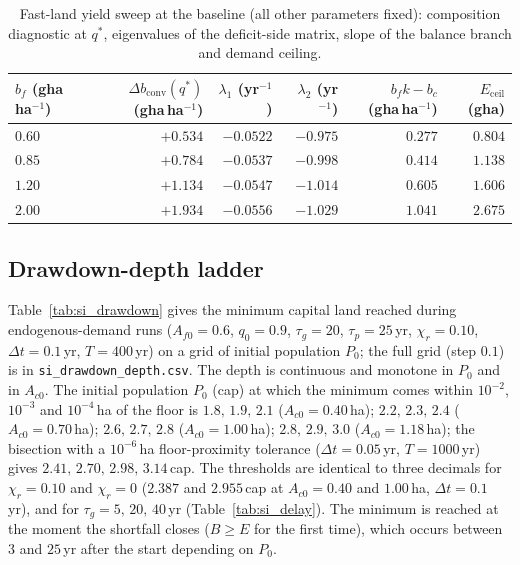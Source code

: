 \documentclass[11pt,a4paper]{article}
\newcommand{\dconv}{\Delta b_{\mathrm{conv}}}
\newcommand{\Eceil}{E_{\mathrm{ceil}}}
\begin{document}
\begin{table}[htbp]
\centering\small
\caption{Fast-land yield sweep at the baseline (all other parameters fixed): composition diagnostic at $q^*$, eigenvalues of the deficit-side matrix, slope of the balance branch and demand ceiling.}
\label{tab:si_sweep}
\begin{tabular}{l r r r r r}
\toprule
$b_f$ (gha\,ha$^{-1}$) & $\dconv(q^*)$ (gha\,ha$^{-1}$) & $\lambda_1$ (yr$^{-1}$) & $\lambda_2$ (yr$^{-1}$) & $b_fk-b_c$ (gha\,ha$^{-1}$) & $\Eceil$ (gha) \\
\midrule
$0.60$ & $+0.534$ & $-0.0522$ & $-0.975$ & $0.277$ & $0.804$ \\
$0.85$ & $+0.784$ & $-0.0537$ & $-0.998$ & $0.414$ & $1.138$ \\
$1.20$ & $+1.134$ & $-0.0547$ & $-1.014$ & $0.605$ & $1.606$ \\
$2.00$ & $+1.934$ & $-0.0556$ & $-1.029$ & $1.041$ & $2.675$ \\
\bottomrule
\end{tabular}
\end{table}

\subsection{Drawdown-depth ladder}\label{si:ladder}

Table~\ref{tab:si_drawdown} gives the minimum capital land reached during endogenous-demand runs ($A_{f0}=0.6$, $q_0=0.9$, $\tau_g=20$, $\tau_p=25$\,yr, $\chi_r=0.10$, $\Delta t=0.1$\,yr, $T=400$\,yr) on a grid of initial population $P_0$; the full grid (step $0.1$) is in \texttt{si\_drawdown\_depth.csv}. The depth is continuous and monotone in $P_0$ and in $A_{c0}$. The initial population $P_0$ (cap) at which the minimum comes within $10^{-2}$, $10^{-3}$ and $10^{-4}$\,ha of the floor is $1.8,\,1.9,\,2.1$ ($A_{c0}=0.40$\,ha); $2.2,\,2.3,\,2.4$ ($A_{c0}=0.70$\,ha); $2.6,\,2.7,\,2.8$ ($A_{c0}=1.00$\,ha); $2.8,\,2.9,\,3.0$ ($A_{c0}=1.18$\,ha); the bisection with a $10^{-6}$\,ha floor-proximity tolerance ($\Delta t=0.05$\,yr, $T=1000$\,yr) gives $2.41,\,2.70,\,2.98,\,3.14$\,cap. The thresholds are identical to three decimals for $\chi_r=0.10$ and $\chi_r=0$ ($2.387$ and $2.955$\,cap at $A_{c0}=0.40$ and $1.00$\,ha, $\Delta t=0.1$\,yr), and for $\tau_g=5,\,20,\,40$\,yr (Table~\ref{tab:si_delay}). The minimum is reached at the moment the shortfall closes ($B\ge E$ for the first time), which occurs between $3$ and $25$\,yr after the start depending on $P_0$.
\end{document}
